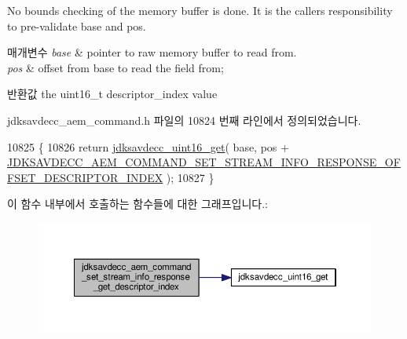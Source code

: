 No bounds checking of the memory buffer is done. It is the caller\textquotesingle{}s responsibility to pre-\/validate base and pos.


\begin{DoxyParams}{매개변수}
{\em base} & pointer to raw memory buffer to read from. \\
\hline
{\em pos} & offset from base to read the field from; \\
\hline
\end{DoxyParams}
\begin{DoxyReturn}{반환값}
the uint16\+\_\+t descriptor\+\_\+index value 
\end{DoxyReturn}


jdksavdecc\+\_\+aem\+\_\+command.\+h 파일의 10824 번째 라인에서 정의되었습니다.


\begin{DoxyCode}
10825 \{
10826     \textcolor{keywordflow}{return} \hyperlink{group__endian_ga3fbbbc20be954aa61e039872965b0dc9}{jdksavdecc\_uint16\_get}( base, pos + 
      \hyperlink{group__command__set__stream__info__response_ga8e3f85ed6089d9adb5b76f80df6d9bb1}{JDKSAVDECC\_AEM\_COMMAND\_SET\_STREAM\_INFO\_RESPONSE\_OFFSET\_DESCRIPTOR\_INDEX}
       );
10827 \}
\end{DoxyCode}


이 함수 내부에서 호출하는 함수들에 대한 그래프입니다.\+:
\nopagebreak
\begin{figure}[H]
\begin{center}
\leavevmode
\includegraphics[width=350pt]{group__command__set__stream__info__response_ga5beccd46178ec84a68905e0520124ef5_cgraph}
\end{center}
\end{figure}




